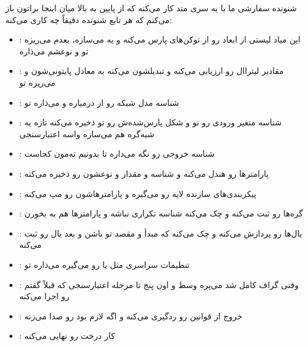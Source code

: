 \documentclass{nngraph-fa}
\begin{document}
شنونده سفارشی ما با یه سری متد  کار می‌کنه که از پایین به بالا میان
اینجا براتون باز می‌کنم که هر تابع شنونده دقیقاً چه کاری می‌کنه:

\begin{itemize}
    \item \textbf{}: این میاد لیستی از ابعاد رو از توکن‌های  پارس می‌کنه و یه  می‌سازه، بعدم می‌ریزه تو  و نوعشم می‌ذاره 
    \item \textbf{}: مقادیر لیتراال رو ارزیابی می‌کنه و تبدیلشون می‌کنه به معادل پایتونی‌شون و می‌ریزه تو 
    \item \textbf{}: شناسه مدل شبکه رو از  درمیاره و می‌ذاره تو 
    \item \textbf{}: شناسه متغیر ورودی رو تو  و شکل پارس‌شده‌ش رو تو  ذخیره می‌کنه
    تازه یه شبه‌گره  هم می‌سازه واسه اعتبارسنجی
    \item \textbf{}: شناسه خروجی رو نگه می‌داره تا بدونیم ته‌مون کجاست
    \item \textbf{}: پارامترها رو هندل می‌کنه و شناسه و مقدار و نوعشون رو ذخیره می‌کنه
    \item \textbf{}: پیکربندی‌های سازنده لایه رو می‌گیره و پارامترهاشون رو مپ می‌کنه
    \item \textbf{}: گره‌ها رو ثبت می‌کنه و چک می‌کنه شناسه تکراری نباشه و پارامترها هم به  بخورن
    \item \textbf{}: یال‌ها رو پردازش می‌کنه و چک می‌کنه که مبدأ و مقصد تو  باشن و بعد یال رو ثبت می‌کنه
    \item \textbf{}: تنظیمات سراسری مثل  یا  رو می‌گیره می‌ذاره تو 
    \item \textbf{}: وقتی گراف کامل شد می‌پره وسط و اون پنج تا مرحله اعتبارسنجی که قبلاً گفتم رو اجرا می‌کنه
    \item \textbf{}: خروج از قوانین رو ردگیری می‌کنه و اگه لازم بود  رو صدا می‌زنه
    \item \textbf{}: کار درخت  رو نهایی می‌کنه
\end{itemize}
\end{document}
